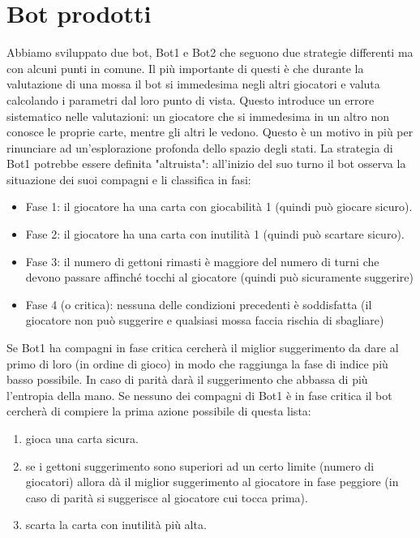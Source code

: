 \documentclass{article}
\begin{document}
\section{Bot prodotti}
Abbiamo sviluppato due bot, Bot1 e Bot2 che seguono due strategie differenti ma con alcuni punti in comune. Il più importante di questi è che durante la valutazione di una mossa il bot si immedesima negli altri giocatori e valuta calcolando i parametri dal loro punto di vista. Questo introduce un errore sistematico nelle valutazioni: un giocatore che si immedesima in un altro non conosce le proprie carte, mentre gli altri le vedono. Questo è un motivo in più per rinunciare ad un'esplorazione profonda dello spazio degli stati.\newline
\newline
La strategia di Bot1 potrebbe essere definita "altruista": all'inizio del suo turno il bot osserva la situazione dei suoi compagni e li classifica in fasi:
\begin{itemize}
    \item Fase 1: il giocatore ha una carta con giocabilità 1 (quindi può giocare sicuro).
    \item Fase 2: il giocatore ha una carta con inutilità 1 (quindi può scartare sicuro).
    \item Fase 3: il numero di gettoni rimasti è maggiore del numero di turni che devono passare affinché tocchi al giocatore (quindi può sicuramente suggerire)
    \item Fase 4 (o critica): nessuna delle condizioni precedenti è soddisfatta (il giocatore non può suggerire e qualsiasi mossa faccia rischia di sbagliare)
\end{itemize}
Se Bot1 ha compagni in fase critica cercherà il miglior suggerimento da dare al primo di loro (in ordine di gioco) in modo che raggiunga la fase di indice più basso possibile. In caso di parità darà il suggerimento che abbassa di più l'entropia della mano.\newline
Se nessuno dei compagni di Bot1 è in fase critica il bot cercherà di compiere la prima azione possibile di questa lista:
\begin{enumerate}
    \item gioca una carta sicura.
    \item se i gettoni suggerimento sono superiori ad un certo limite (numero di giocatori) allora dà il miglior suggerimento al giocatore in fase peggiore (in caso di parità si suggerisce al giocatore cui tocca prima).
    \item scarta la carta con inutilità più alta.
\end{enumerate}
\end{document}
